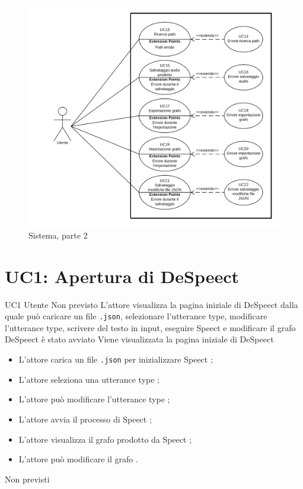 \documentclass[../AnalisideiRequisiti.tex]{subfiles}
\begin{document}
	\begin{figure}[p]
		\centering
		\includegraphics[width=\textwidth]{../img/UCp2.png}
		\caption{Sistema, parte 2}
	\end{figure}
	
	\section{UC1: Apertura di DeSpeect}
	\UserCase
	{UC1}
	{Utente}
	{Non previsto}
	{L'attore visualizza la pagina iniziale di DeSpeect dalla quale può caricare un file \verb|.json|, selezionare l'utterance type, modificare l'utterance type, scrivere del testo in input, eseguire Speect e modificare il grafo}
	{DeSpeect è stato avviato}
	{Viene visualizzata la pagina iniziale di DeSpeect}
	{
		\begin{itemize}
			\item{} L'attore carica un file \verb|.json| per inizializzare Speect ;
			\item{} L'attore seleziona una utterance type ;
			\item{} L'attore può modificare l'utterance type ;
			\item{} L'attore avvia il processo di Speect ;
			\item{} L'attore visualizza il grafo prodotto da Speect ;
			\item{} L'attore può modificare il grafo .
		\end{itemize}
	}
	{Non previsti}
	
\end{document}
